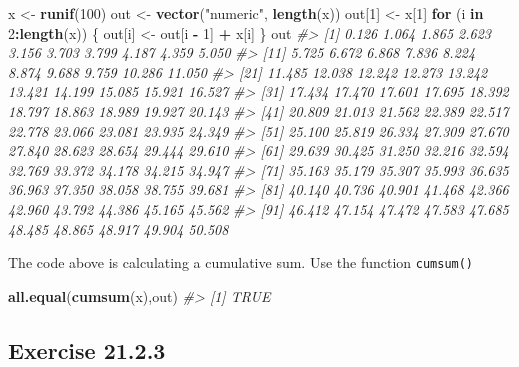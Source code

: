 \documentclass[]{book}
\newenvironment{Shaded}{\begin{snugshade}}{\end{snugshade}}
\newcommand{\CommentTok}[1]{\textcolor[rgb]{0.56,0.35,0.01}{\textit{#1}}}
\newcommand{\ControlFlowTok}[1]{\textcolor[rgb]{0.13,0.29,0.53}{\textbf{#1}}}
\newcommand{\DecValTok}[1]{\textcolor[rgb]{0.00,0.00,0.81}{#1}}
\newcommand{\KeywordTok}[1]{\textcolor[rgb]{0.13,0.29,0.53}{\textbf{#1}}}
\newcommand{\NormalTok}[1]{#1}
\newcommand{\OperatorTok}[1]{\textcolor[rgb]{0.81,0.36,0.00}{\textbf{#1}}}
\newcommand{\StringTok}[1]{\textcolor[rgb]{0.31,0.60,0.02}{#1}}
\theoremstyle{plain}
\theoremstyle{remark}
\theoremstyle{definition}
\theoremstyle{definition}
\theoremstyle{definition}
\theoremstyle{remark}
\begin{document}
\begin{Shaded}
\begin{Highlighting}[]
\NormalTok{x <-}\StringTok{ }\KeywordTok{runif}\NormalTok{(}\DecValTok{100}\NormalTok{)}
\NormalTok{out <-}\StringTok{ }\KeywordTok{vector}\NormalTok{(}\StringTok{"numeric"}\NormalTok{, }\KeywordTok{length}\NormalTok{(x))}
\NormalTok{out[}\DecValTok{1}\NormalTok{] <-}\StringTok{ }\NormalTok{x[}\DecValTok{1}\NormalTok{]}
\ControlFlowTok{for}\NormalTok{ (i }\ControlFlowTok{in} \DecValTok{2}\OperatorTok{:}\KeywordTok{length}\NormalTok{(x)) \{}
\NormalTok{  out[i] <-}\StringTok{ }\NormalTok{out[i }\OperatorTok{-}\StringTok{ }\DecValTok{1}\NormalTok{] }\OperatorTok{+}\StringTok{ }\NormalTok{x[i]}
\NormalTok{\}}
\NormalTok{out}
\CommentTok{#>   [1]  0.126  1.064  1.865  2.623  3.156  3.703  3.799  4.187  4.359  5.050}
\CommentTok{#>  [11]  5.725  6.672  6.868  7.836  8.224  8.874  9.688  9.759 10.286 11.050}
\CommentTok{#>  [21] 11.485 12.038 12.242 12.273 13.242 13.421 14.199 15.085 15.921 16.527}
\CommentTok{#>  [31] 17.434 17.470 17.601 17.695 18.392 18.797 18.863 18.989 19.927 20.143}
\CommentTok{#>  [41] 20.809 21.013 21.562 22.389 22.517 22.778 23.066 23.081 23.935 24.349}
\CommentTok{#>  [51] 25.100 25.819 26.334 27.309 27.670 27.840 28.623 28.654 29.444 29.610}
\CommentTok{#>  [61] 29.639 30.425 31.250 32.216 32.594 32.769 33.372 34.178 34.215 34.947}
\CommentTok{#>  [71] 35.163 35.179 35.307 35.993 36.635 36.963 37.350 38.058 38.755 39.681}
\CommentTok{#>  [81] 40.140 40.736 40.901 41.468 42.366 42.960 43.792 44.386 45.165 45.562}
\CommentTok{#>  [91] 46.412 47.154 47.472 47.583 47.685 48.485 48.865 48.917 49.904 50.508}
\end{Highlighting}
\end{Shaded}

The code above is calculating a cumulative sum. Use the function
\texttt{cumsum()}

\begin{Shaded}
\begin{Highlighting}[]
\KeywordTok{all.equal}\NormalTok{(}\KeywordTok{cumsum}\NormalTok{(x),out)}
\CommentTok{#> [1] TRUE}
\end{Highlighting}
\end{Shaded}

\hypertarget{exercise-21.2.3}{%
\subsection*{\texorpdfstring{Exercise
{21.2.3}}{Exercise 21.2.3}}\label{exercise-21.2.3}}
\end{document}

